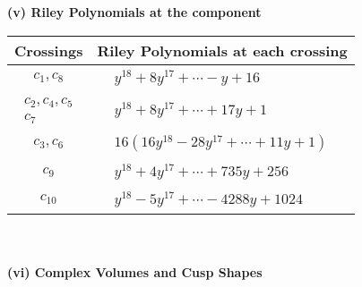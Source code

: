 \documentclass[1p]{elsarticle_modified}
\theoremstyle{definition}
\begin{document}
\flushleft \textbf{(v) Riley Polynomials at the component}\newline \\
\begin{tabular}{m{50pt}|m{274pt}}
Crossings & \hspace{64pt}Riley Polynomials at each crossing \\
\hline $$\begin{aligned}c_{1},c_{8}\end{aligned}$$&$\begin{aligned}
&y^{18}+8 y^{17}+\cdots- y+16
\end{aligned}$\\
\hline $$\begin{aligned}c_{2},c_{4},c_{5}\\c_{7}\end{aligned}$$&$\begin{aligned}
&y^{18}+8 y^{17}+\cdots+17 y+1
\end{aligned}$\\
\hline $$\begin{aligned}c_{3},c_{6}\end{aligned}$$&$\begin{aligned}
&16(16 y^{18}-28 y^{17}+\cdots+11 y+1)
\end{aligned}$\\
\hline $$\begin{aligned}c_{9}\end{aligned}$$&$\begin{aligned}
&y^{18}+4 y^{17}+\cdots+735 y+256
\end{aligned}$\\
\hline $$\begin{aligned}c_{10}\end{aligned}$$&$\begin{aligned}
&y^{18}-5 y^{17}+\cdots-4288 y+1024
\end{aligned}$\\
\hline
\end{tabular}\\~\\
\newpage\flushleft \textbf{(vi) Complex Volumes and Cusp Shapes}
\end{document}
